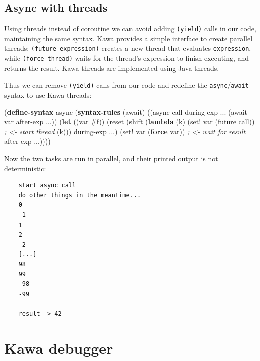 \documentclass[12pt,a4paper,oneside,openright]{book}
\newenvironment{Shaded}{\begin{snugshade}}{\end{snugshade}}
\newcommand{\KeywordTok}[1]{\textcolor[rgb]{0.13,0.29,0.53}{\textbf{{#1}}}}
\newcommand{\DecValTok}[1]{\textcolor[rgb]{0.00,0.00,0.81}{{#1}}}
\newcommand{\CommentTok}[1]{\textcolor[rgb]{0.56,0.35,0.01}{\textit{{#1}}}}
\newcommand{\FunctionTok}[1]{\textcolor[rgb]{0.00,0.00,0.00}{{#1}}}
\newcommand{\NormalTok}[1]{{#1}}
\begin{document}
\subsection{Async with threads}\label{async-with-threads}

Using threads instead of coroutine we can avoid adding \texttt{(yield)}
calls in our code, maintaining the same syntax. Kawa provides a simple
interface to create parallel threads: \texttt{(future\ expression)}
creates a new thread that evaluates \texttt{expression}, while
\texttt{(force\ thread)} waits for the thread's expression to finish
executing, and returns the result. Kawa threads are implemented using
Java threads.

Thus we can remove \texttt{(yield)} calls from our code and redefine the
\texttt{async}/\texttt{await} syntax to use Kawa threads:

\begin{Shaded}
\begin{Highlighting}[]
    \NormalTok{(}\KeywordTok{define-syntax}\FunctionTok{ async}
      \NormalTok{(}\KeywordTok{syntax-rules} \NormalTok{(await)}
        \NormalTok{((async call during-exp ...}
           \NormalTok{(await var after-exp ...))}
         \NormalTok{(}\KeywordTok{let} \NormalTok{((var }\DecValTok{#f}\NormalTok{))}
            \NormalTok{(reset}
             \NormalTok{(shift (}\KeywordTok{lambda} \NormalTok{(k)}
                  \NormalTok{(set! var (future call)) }\CommentTok{; <- start thread}
                  \NormalTok{(k)))}
             \NormalTok{during-exp ...)}
            \NormalTok{(set! var (}\KeywordTok{force} \NormalTok{var)) }\CommentTok{; <- wait for result}
            \NormalTok{after-exp ...))))}
\end{Highlighting}
\end{Shaded}

Now the two tasks are run in parallel, and their printed output is not
deterministic:

\begin{verbatim}
    start async call
    do other things in the meantime...
    0
    -1
    1
    2
    -2
    [...]
    98
    99
    -98
    -99

    result -> 42
\end{verbatim}

\newpage

\section{Kawa debugger}\label{kawa-debugger}
\end{document}
